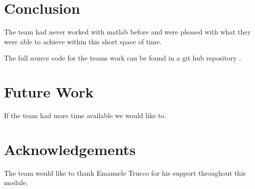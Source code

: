\documentclass[twocolumn]{article}
\begin{document}



\section{Conclusion}
\vspace{-1ex}

The team had never worked with matlab before and were pleased with what they were able to achieve within this short space of time.

The full source code for the teams work can be found in a git hub repository \cite{githublink}.

\section{Future Work} 
\vspace{-1ex}

If the team had more time available we would like to.  


\section*{Acknowledgements}
The team would like to thank Emanuele Trucco for his support throughout this module. 





\end{document}
